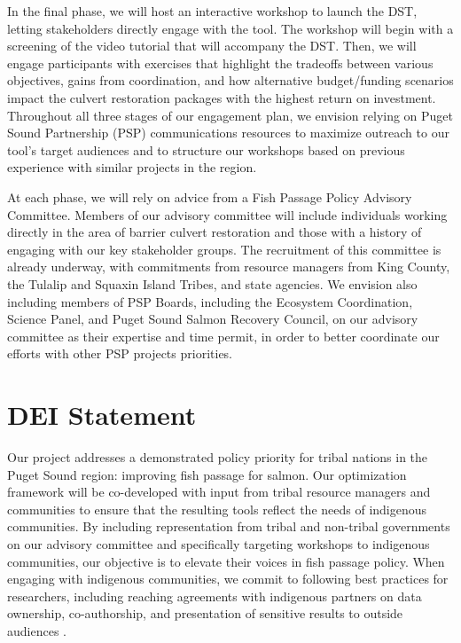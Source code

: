 \documentclass[12pt]{elsarticle}
\begin{document}
	In the final phase, we will host an interactive workshop to launch the DST, letting stakeholders directly engage with the tool. The workshop will begin with a screening of the video tutorial that will accompany the DST. Then, we will engage participants with exercises that highlight the tradeoffs between various objectives, gains from coordination, and how alternative budget/funding scenarios impact the culvert restoration packages with the highest return on investment. Throughout all three stages of our engagement plan, we envision relying on Puget Sound Partnership (PSP) communications resources to maximize outreach to our tool's target audiences and to structure our workshops based on previous experience with similar projects in the region. 
	
	At each phase, we will rely on advice from a Fish Passage Policy Advisory Committee. Members of our advisory committee will include individuals working directly in the area of barrier culvert restoration and those with a history of engaging with our key stakeholder groups. The recruitment of this committee is already underway, with commitments from resource managers from King County, the Tulalip and Squaxin Island Tribes, and state agencies. We envision also including members of PSP Boards, including the Ecosystem Coordination, Science Panel, and Puget Sound Salmon Recovery Council, on our advisory committee as their expertise and time permit, in order to better coordinate our efforts with other PSP projects priorities. 
	
	\section{DEI Statement}
	Our project addresses a demonstrated policy priority for tribal nations in the Puget Sound region: improving fish passage for salmon. Our optimization framework will be co-developed with input from tribal resource managers and communities to ensure that the resulting tools reflect the needs of indigenous communities. By including representation from tribal and non-tribal governments on our advisory committee and specifically targeting workshops to indigenous communities, our objective is to elevate their voices in fish passage policy. When engaging with indigenous communities, we commit to following best practices for researchers, including reaching agreements with indigenous partners on data ownership, co-authorship, and presentation of sensitive results to outside audiences \cite{ban_incorporate_2018}.
	
\end{document}
